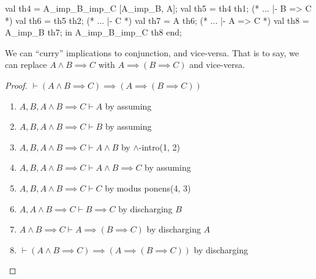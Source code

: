     val th4 =  A_imp_B_imp_C [A_imp_B, A];
    val th5 =  th4 th1; (* ... |- B => C *)
    val th6 =  th5 th2; (* ... |- C *)
    val th7 =  A th6; (* ... |- A => C *)
    val th8 =  A_imp_B th7;
  in
     A_imp_B_imp_C th8
  end;
\eatline
{}\nwendcode{}\nwdocspar
\begin{node}
We can ``curry'' implications to conjunction, and vice-versa. That is
to say, we can replace $A\land B\implies C$ with $A\implies(B\implies C)$
and vice-versa.
\end{node}

\begin{proof}
$\vdash(A\land B\implies C)\implies(A\implies(B\implies C))$
\begin{enumerate}
\item $A,B,A\land B\implies C\vdash A$ by assuming
\item $A,B,A\land B\implies C\vdash B$ by assuming
\item $A,B,A\land B\implies C\vdash A\land B$ by $\land$-intro(1, 2)
\item $A,B,A\land B\implies C\vdash A\land B\implies C$ by assuming
\item $A,B,A\land B\implies C\vdash C$ by modus ponens(4, 3)
\item $A,A\land B\implies C\vdash B\implies C$ by discharging $B$
\item $A\land B\implies C\vdash A\implies(B\implies C)$ by discharging $A$
\item $\vdash(A\land B\implies C)\implies(A\implies(B\implies C))$ by discharging \qedhere
\end{enumerate}
\end{proof}

